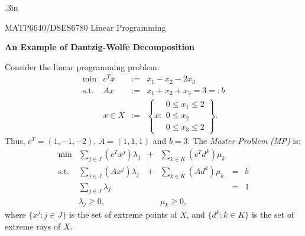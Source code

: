 
\renewcommand{\baselinestretch}{1.4}

\oddsidemargin .3in
\textwidth 6in
\textheight 8.8in
\topmargin -30pt

\pagestyle{myheadings}





\begin{center}
   MATP6640/DSES6780 Linear Programming
\end{center}

\begin{center}
  {\large\bf An Example of Dantzig-Wolfe Decomposition}
\end{center}

Consider the linear programming problem:
\begin{displaymath}
  \begin{array}{lccl}
    \min         & c^Tx    & := & x_1 - x_2 - 2x_3 \\
    \mbox{s.t. } & Ax      & := & x_1 + x_2 + x_3 = 3 =: b \\
                 & x \in X & := & \left\{x : \begin{array}{l}
                                          0 \leq x_1 \leq 2 \\
                                          0 \leq x_2 \\
                                          0 \leq x_3 \leq 2
                                        \end{array} \right\}.
  \end{array}
\end{displaymath}
Thus, $c^T=(1,-1,-2)$, $A=(1,1,1)$ and $b=3$.
The {\em Master Problem (MP)} is:
\begin{displaymath}
  \begin{array}{lrcrcl}
    \min         & \sum_{j\in J} (c^Tx^j) \lambda_j & + &
                      \sum_{k\in K} (c^Td^k) \mu_k \\
    \mbox{s.t. } & \sum_{j\in J} (Ax^j) \lambda_j & + & 
                      \sum_{k\in K} (Ad^k) \mu_k & = & b \\
                 & \sum_{j\in J} \lambda_j &&& = & 1 \\
                 & \lambda_j \geq 0, && \mu_k \geq 0,
  \end{array}
\end{displaymath}
where $\{x^j:j \in J \}$ is the set of extreme points of $X$, and
$\{d^k:k \in K \}$ is the set of extreme rays of $X$.


